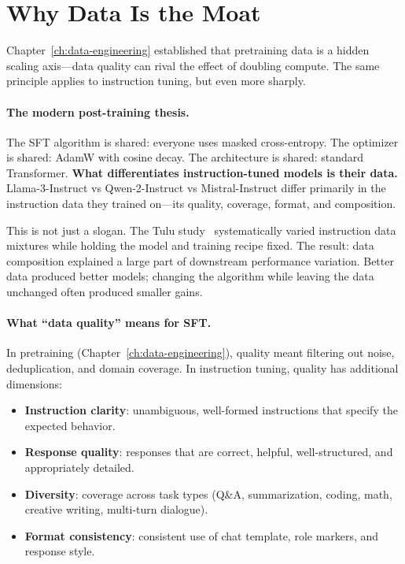 
\section{Why Data Is the Moat}
\label{sec:data-moat}

Chapter~\ref{ch:data-engineering} established that pretraining data is a hidden scaling axis---data quality can rival the effect of doubling compute. The same principle applies to instruction tuning, but even more sharply.

\paragraph{The modern post-training thesis.} The SFT algorithm is shared: everyone uses masked cross-entropy. The optimizer is shared: AdamW with cosine decay. The architecture is shared: standard Transformer. \textbf{What differentiates instruction-tuned models is their data.} Llama-3-Instruct vs Qwen-2-Instruct vs Mistral-Instruct differ primarily in the instruction data they trained on---its quality, coverage, format, and composition.

This is not just a slogan. The Tulu study~\cite{ivison2023tulu} systematically varied instruction data mixtures while holding the model and training recipe fixed. The result: data composition explained a large part of downstream performance variation. Better data produced better models; changing the algorithm while leaving the data unchanged often produced smaller gains.

\paragraph{What ``data quality'' means for SFT.} In pretraining (Chapter~\ref{ch:data-engineering}), quality meant filtering out noise, deduplication, and domain coverage. In instruction tuning, quality has additional dimensions:

\begin{itemize}[nosep]
  \item \textbf{Instruction clarity}: unambiguous, well-formed instructions that specify the expected behavior.
  \item \textbf{Response quality}: responses that are correct, helpful, well-structured, and appropriately detailed.
  \item \textbf{Diversity}: coverage across task types (Q\&A, summarization, coding, math, creative writing, multi-turn dialogue).
  \item \textbf{Format consistency}: consistent use of chat template, role markers, and response style.
\end{itemize}

